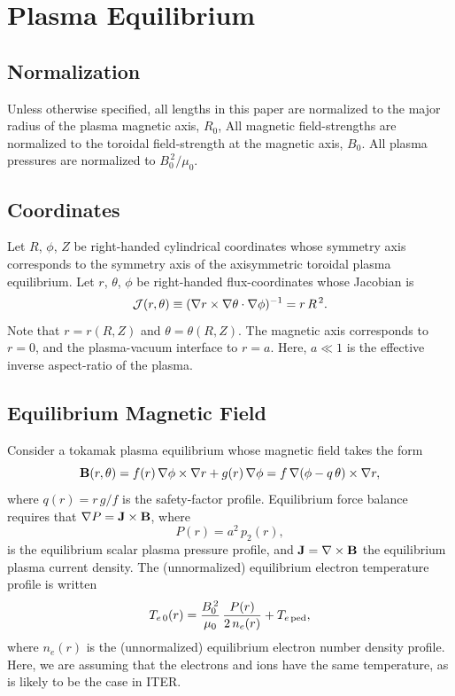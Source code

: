 \documentclass[12pt,prb,aps]{revtex4-1}
\begin{document}
\section{Plasma Equilibrium}\label{s2}
\subsection{Normalization}\label{norm}
Unless otherwise specified, all lengths in this paper are normalized to  the major radius of the plasma magnetic axis, $R_0$, All  magnetic field-strengths
are normalized to the  toroidal field-strength at the magnetic axis, $B_0$. All plasma pressures are normalized to $B_0^{\,2}/\mu_0$.

\subsection{Coordinates}\label{coord}
Let $R$, $\phi$, $Z$ be right-handed cylindrical coordinates whose symmetry axis corresponds to the symmetry axis of the axisymmetric toroidal plasma equilibrium.
Let $r$, $\theta$, $\phi$ be right-handed flux-coordinates whose
Jacobian is
\begin{equation}\label{jac}
{\cal J}(r,\theta)\equiv (\nabla r\times \nabla\theta\cdot\nabla\phi)^{-1}= r\,R^{\,2}.
\end{equation}
Note that $r=r(R,Z)$ and $\theta=\theta(R,Z)$. 
The magnetic axis corresponds to $r=0$, and the plasma-vacuum interface to $r=a$. Here, $a\ll 1$ is the effective inverse aspect-ratio of the plasma. 

\subsection{Equilibrium Magnetic Field}\label{equilb}
Consider a tokamak plasma equilibrium whose magnetic field takes the form
\begin{equation}
{\bf B}(r,\theta) = f(r)\,\nabla\phi\times \nabla r + g(r)\,\nabla\phi = f\,\nabla(\phi-q\,\theta)\times \nabla r,
\end{equation}
where
$q(r) = r\,g/f$ is the safety-factor profile.
Equilibrium force balance requires that
$ \nabla P={\bf J}\times {\bf B}$, 
where 
\begin{equation}
P(r)= a^2\,p_2(r),
\end{equation}
 is the equilibrium scalar plasma pressure profile, and ${\bf J}=\nabla\times {\bf B}$ the equilibrium plasma current density. 
 The (unnormalized) equilibrium electron temperature profile is written
 \begin{equation}
 T_{e\,0}(r) = \frac{B_0^{\,2}}{\mu_0}\,\frac{P(r)}{2\,n_e(r)} + T_{e\,{\rm ped}},
 \end{equation}
 where $n_e(r)$ is the (unnormalized) equilibrium electron number density profile. Here, we are assuming that the electrons and ions have the same
 temperature, as is likely to be the case in ITER. 
\end{document}
